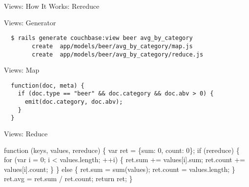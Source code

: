 \documentclass[aspectratio=43]{beamer}
\begin{document}
\begin{frame}[fragile]{Views: How It Works: Rereduce}
\end{frame}

\begin{frame}[fragile]{Views: Generator}
  \begin{verbatim}
  $ rails generate couchbase:view beer avg_by_category
        create  app/models/beer/avg_by_category/map.js
        create  app/models/beer/avg_by_category/reduce.js
  \end{verbatim}
\end{frame}

\begin{frame}[fragile]{Views: Map}
  \begin{verbatim}
  function(doc, meta) {
    if (doc.type == "beer" && doc.category && doc.abv > 0) {
      emit(doc.category, doc.abv);
    }
  }
  \end{verbatim}
\end{frame}

\begin{frame}[fragile]{Views: Reduce}
  \begin{semiverbatim}
  function (keys, values, rereduce) \{
    var ret = \{sum: 0, count: 0\};
    if (\alert<2,3>{rereduce}) \{
      \alert<3>{for (var i = 0; i < values.length; ++i) \{
        ret.sum += values[i].sum;
        ret.count += values[i].count;
      \}}
    \} else \{
      \alert<2>{ret.sum = sum(values);
      ret.count = values.length;}
    \}
    ret.avg = ret.sum / ret.count;
    return ret;
  \}
  \end{semiverbatim}
\end{frame}
\end{document}
